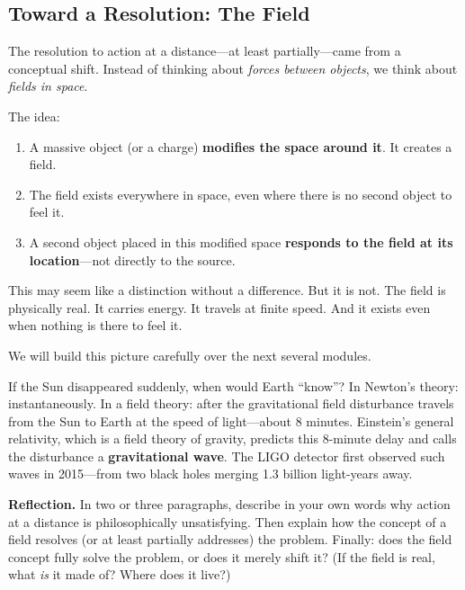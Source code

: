 \documentclass[12pt, a4paper, twoside]{book}
\newcounter{problem}[chapter]
\theoremstyle{disc}
\begin{document}
\subsection{Toward a Resolution: The Field}

The resolution to action at a distance---at least partially---came from a conceptual shift. Instead of thinking about \textit{forces between objects}, we think about \textit{fields in space}.

The idea:

\begin{enumerate}[leftmargin=2em,itemsep=3pt]
  \item A massive object (or a charge) \textbf{modifies the space around it}. It creates a field.
  \item The field exists everywhere in space, even where there is no second object to feel it.
  \item A second object placed in this modified space \textbf{responds to the field at its location}---not directly to the source.
\end{enumerate}

This may seem like a distinction without a difference. But it is not. The field is physically real. It carries energy. It travels at finite speed. And it exists even when nothing is there to feel it.

We will build this picture carefully over the next several modules.

\begin{deepquestion}
If the Sun disappeared suddenly, when would Earth ``know''? In Newton's theory: instantaneously. In a field theory: after the gravitational field disturbance travels from the Sun to Earth at the speed of light---about 8 minutes. Einstein's general relativity, which is a field theory of gravity, predicts this 8-minute delay and calls the disturbance a \textbf{gravitational wave}. The LIGO detector first observed such waves in 2015---from two black holes merging 1.3 billion light-years away.
\end{deepquestion}

\begin{reflectionbox}
\textbf{Reflection.} In two or three paragraphs, describe in your own words why action at a distance is philosophically unsatisfying. Then explain how the concept of a field resolves (or at least partially addresses) the problem. Finally: does the field concept fully solve the problem, or does it merely shift it? (If the field is real, what \textit{is} it made of? Where does it live?)
\end{reflectionbox}
\end{document}
